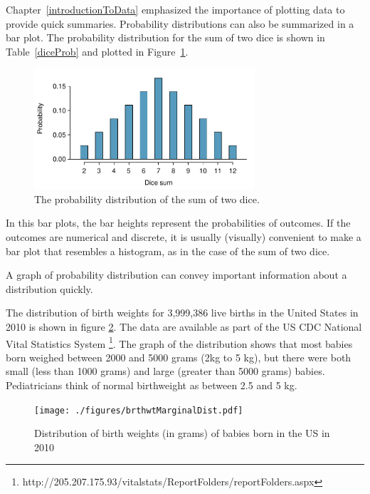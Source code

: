 Chapter~\ref{introductionToData} emphasized the importance of plotting data to provide quick summaries. Probability distributions can also be summarized in a bar plot. The probability distribution for the sum of two dice is shown in Table~\ref{diceProb} and plotted in Figure~\ref{diceSumDist}.

\begin{figure}
\centering
\includegraphics[width=0.73\textwidth]{ch_probability/figures/diceSumDist/diceSumDist}
\caption{The probability distribution of the sum of two dice.}
\label{diceSumDist}
\end{figure}

In this bar plots, the bar heights represent the probabilities of outcomes. If the outcomes are numerical and discrete, it is usually (visually) convenient to make a bar plot that resembles a histogram, as in the case of the sum of two dice.  

A graph of probability distribution can convey important information about a distribution quickly.

The distribution of birth weights for 3,999,386 live births in the United States in 2010 is shown in figure \ref{fig:brthwtMarginalDist}.  The data are available as part of the US CDC National Vital Statistics System \footnote{http://205.207.175.93/vitalstats/ReportFolders/reportFolders.aspx }.   The graph of the distribution shows that most babies born weighed between 2000 and 5000 grams (2kg to 5 kg), but there were both small (less than 1000 grams) and large (greater than 5000 grams) babies. Pediatricians think of normal birthweight as between 2.5 and 5 kg.
   \begin{figure}
   \texttt{[image: ./figures/brthwtMarginalDist.pdf]}
   \caption{Distribution of birth weights (in grams) of babies born in the US in 2010}
   \label{fig:brthwtMarginalDist}
   \end{figure}
   



